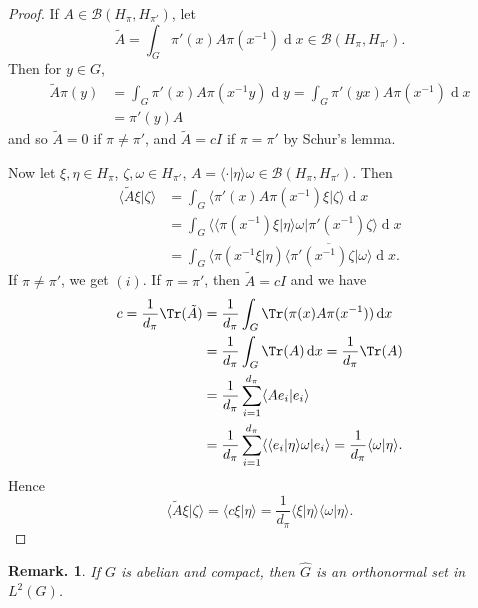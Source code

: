 \documentclass[11pt, a4paper]{memoir}
\theoremstyle{change}
\theoremstyle{plain}
\theoremstyle{nonumberplain}
\newtheorem{remark}{Remark.}
\newtheorem{proof}{Proof}
\renewcommand{\d}[1]{\ensuremath{\operatorname{d}\!{#1}}}
\numberwithin{equation}{section}
\begin{document}
\begin{proof}
    If $A\in\mathcal{B}(H_\pi,H_{\pi'})$, let
    \begin{equation*}
        \tilde{A}=\int_G\pi'(x)A\pi(x^{-1})\d{x}\in\mathcal{B}(H_\pi,H_{\pi'}).
    \end{equation*}
    Then for $y\in G$,
    \begin{align*}
        \tilde{A}\pi(y) &= \int_G\pi'(x)A\pi(x^{-1}y)\d{y} = \int_G\pi'(yx)A\pi(x^{-1})\d{x}\\
                        &= \pi'(y)A
    \end{align*}
    and so $\tilde{A}=0$ if $\pi\neq\pi'$, and $\tilde{A}=cI$ if $\pi=\pi'$ by Schur's lemma.

    Now let $\xi,\eta\in H_\pi$, $\zeta,\omega\in H_{\pi'}$, $A=\langle\cdot|\eta\rangle\omega\in\mathcal{B}(H_\pi,H_{\pi'})$.
    Then
    \begin{align*}
        \langle\tilde{A}\xi|\zeta\rangle &= \int_G\langle\pi'(x)A\pi(x^{-1})\xi|\zeta\rangle\d{x}\\
                                         &= \int_G\langle\langle\pi(x^{-1})\xi|\eta\rangle\omega|\pi'(x^{-1})\zeta\rangle\d{x}\\
                                         &= \int_G\langle\pi(x^{-1}\xi|\eta)\overline{\langle\pi'(x^{-1})\zeta|\omega\rangle}\d{x}.
    \end{align*}
    If $\pi\neq \pi'$, we get $(i)$.
    If $\pi=\pi'$, then $\tilde{A}=cI$ and we have
    \begin{align*}
        c=\frac{1}{d_\pi}\Tr(\tilde{A}) &= \frac{1}{d_\pi}\int_G\Tr(\pi(x)A\pi(x^{-1}))\d{x}\\
                                        &= \frac{1}{d_\pi}\int_G\Tr(A)\d{x}=\frac{1}{d_\pi}\Tr(A)\\
                                        &= \frac{1}{d_\pi}\sum_{i=1}^{d_\pi}\langle Ae_i|e_i\rangle\\
                                        &= \frac{1}{d_\pi}\sum_{i=1}^{d_\pi}\langle\langle e_i|\eta\rangle\omega|e_i\rangle=\frac{1}{d_\pi}\langle\omega|\eta\rangle.
    \end{align*}
    Hence
    \begin{equation*}
        \langle\tilde{A}\xi|\zeta\rangle = \langle c\xi|\eta\rangle= \frac{1}{d_\pi}\langle\xi|\eta\rangle\langle\omega|\eta\rangle.
    \end{equation*}
\end{proof}
\begin{remark}
    If $G$ is abelian and compact, then $\widehat{G}$ is an orthonormal set in $L^2(G)$.
\end{remark}
\end{document}
